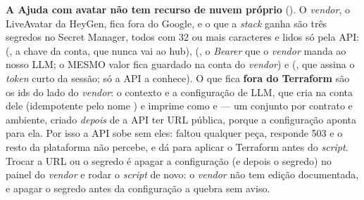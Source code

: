\begin{nota}
\textbf{A Ajuda com avatar não tem recurso de nuvem próprio} ().
O \emph{vendor}, o LiveAvatar da HeyGen, fica fora do Google, e o que a
\emph{stack} ganha são três segredos no Secret Manager, todos com 32 ou mais
caracteres e lidos só pela API: 
(, a chave da conta, que nunca vai ao hub),
 (, o \emph{Bearer}
que o \emph{vendor} manda ao nosso LLM; o MESMO valor fica guardado na conta do
\emph{vendor}) e  (,
que assina o \emph{token} curto da sessão; só a API a conhece). O que fica
\textbf{fora do Terraform} são os ids do lado do \emph{vendor}: o contexto e a
configuração de LLM, que  cria na
conta dele (idempotente pelo nome ) e imprime como
 e  --- um
conjunto por contrato e ambiente, criado \emph{depois} de a API ter URL pública,
porque a configuração aponta para ela. Por isso a API sobe sem eles: faltou
qualquer peça,  responde 503 e o resto da plataforma
não percebe, e dá para aplicar o Terraform antes do \emph{script}. Trocar a URL ou
o segredo é apagar a configuração (e depois o segredo) no painel do
\emph{vendor} e rodar o \emph{script} de novo: o \emph{vendor} não tem edição
documentada, e apagar o segredo antes da configuração a quebra sem aviso.
\end{nota}


